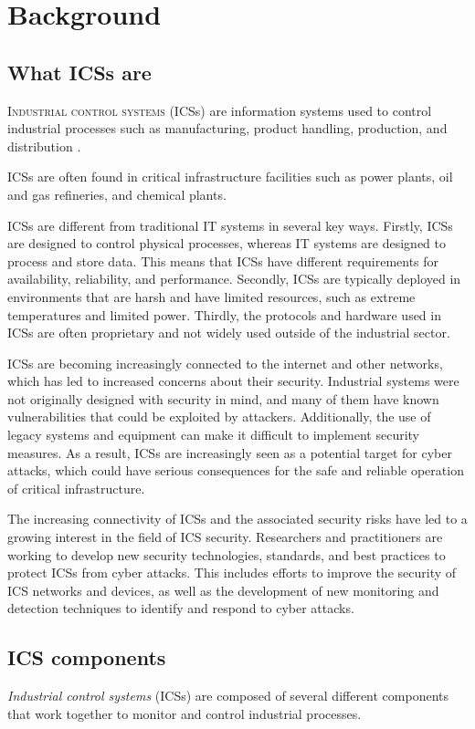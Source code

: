 \chapter{Background}
\label{background}

\section{What ICSs are}
\lettrine[lines=2]{I}{ndustrial control systems} (ICSs) are information systems used to control industrial processes such as manufacturing, product handling, production, and distribution \cite{ics_definition}.

ICSs are often found in critical infrastructure facilities such as power plants, oil and gas refineries, and chemical plants.

\bigskip
ICSs are different from traditional IT systems in several key ways. Firstly, ICSs are designed to control physical processes, whereas IT systems are designed to process and store data. This means that ICSs have different requirements for availability, reliability, and performance. Secondly, ICSs are typically deployed in environments that are harsh and have limited resources, such as extreme temperatures and limited power. Thirdly, the protocols and hardware used in ICSs are often proprietary and not widely used outside of the industrial sector.

\bigskip
ICSs are becoming increasingly connected to the internet and other networks, which has led to increased concerns about their security. Industrial systems were not originally designed with security in mind, and many of them have known vulnerabilities that could be exploited by attackers. Additionally, the use of legacy systems and equipment can make it difficult to implement security measures. As a result, ICSs are increasingly seen as a potential target for cyber attacks, which could have serious consequences for the safe and reliable operation of critical infrastructure.

\bigskip
The increasing connectivity of ICSs and the associated security risks have led to a growing interest in the field of ICS security. Researchers and practitioners are working to develop new security technologies, standards, and best practices to protect ICSs from cyber attacks. This includes efforts to improve the security of ICS networks and devices, as well as the development of new monitoring and detection techniques to identify and respond to cyber attacks.

\section{ICS components}
\label{sec:ics_components}
\textit{Industrial control systems} (ICSs) are composed of several different components that work together to monitor and control industrial processes. 

